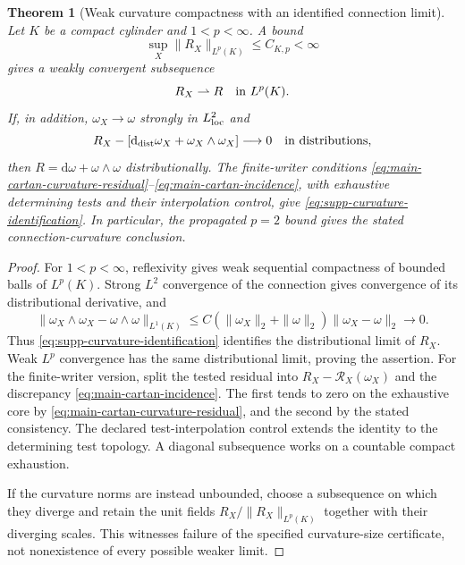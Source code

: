 \documentclass[11pt]{article}
\newtheorem{theorem}{Theorem}[section]
\numberwithin{equation}{section}
\theoremstyle{definition}
\theoremstyle{remark}
\newcommand{\dd}{\mathrm d}
\begin{document}
\begin{theorem}[Weak curvature compactness with an identified connection limit]
\label{thm:supp-curvature-compactness}
Let $K$ be a compact cylinder and $1<p<\infty$.  A bound
\begin{equation}
 \sup_X\|R_X\|_{L^p(K)}\le C_{K,p}<\infty
 \label{eq:supp-curvature-lp-bound}
\end{equation}
gives a weakly convergent subsequence
\begin{equation}
 R_X\rightharpoonup R\quad\hbox{in }L^p(K).
 \label{eq:supp-curvature-reflexive-limit}
\end{equation}
If, in addition, $\omega_X\to\omega$ strongly in $L^2_{\rm loc}$ and
\begin{equation}
 R_X-[\dd_{\rm dist}\omega_X+\omega_X\wedge\omega_X]
       \longrightarrow0\quad\hbox{in distributions},
 \label{eq:supp-curvature-identification}
\end{equation}
then $R=\dd\omega+\omega\wedge\omega$ distributionally.
The finite-writer conditions
\eqref{eq:main-cartan-curvature-residual}--\eqref{eq:main-cartan-incidence},
with exhaustive determining tests and their interpolation control, give
\eqref{eq:supp-curvature-identification}.  In particular, the propagated $p=2$ bound gives the stated connection-curvature conclusion.
\end{theorem}
\begin{proof}
For $1<p<\infty$, reflexivity gives weak sequential compactness of bounded
balls of $L^p(K)$.  Strong $L^2$ convergence of the connection gives
convergence of its distributional derivative, and
\[
 \|\omega_X\wedge\omega_X-\omega\wedge\omega\|_{L^1(K)}
 \le C(\|\omega_X\|_2+\|\omega\|_2)\|\omega_X-\omega\|_2\to0.
\]
Thus \eqref{eq:supp-curvature-identification} identifies the distributional
limit of $R_X$.  Weak $L^p$ convergence has the same distributional limit,
proving the assertion.  For the finite-writer version, split the tested
residual into $R_X-\mathcal R_X(\omega_X)$ and the discrepancy
\eqref{eq:main-cartan-incidence}.  The first tends to zero on the exhaustive
core by \eqref{eq:main-cartan-curvature-residual}, and the second by the
stated consistency.  The declared test-interpolation control extends the
identity to the determining test topology.  A diagonal subsequence works on
a countable compact exhaustion.

If the curvature norms are instead unbounded, choose a subsequence on which
they diverge and retain the unit fields $R_X/\|R_X\|_{L^p(K)}$ together
with their diverging scales.  This witnesses failure of the specified
curvature-size certificate, not nonexistence of every possible weaker limit.
\end{proof}
\end{document}
